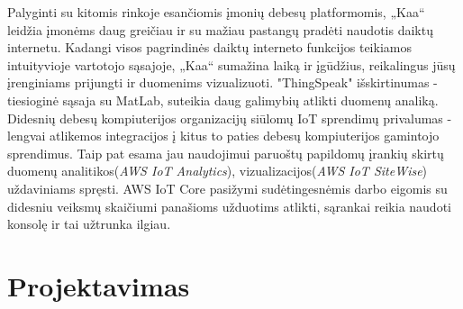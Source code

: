 \documentclass{VUMIFInfBakalaurinis}
\begin{document}
Palyginti su kitomis rinkoje esančiomis įmonių debesų platformomis, „Kaa“ leidžia įmonėms daug greičiau ir su mažiau pastangų pradėti naudotis daiktų internetu.
Kadangi visos pagrindinės daiktų interneto funkcijos teikiamos intuityvioje vartotojo sąsajoje, „Kaa“ sumažina laiką ir įgūdžius, reikalingus jūsų įrenginiams prijungti ir duomenims vizualizuoti.
"ThingSpeak" išskirtinumas - tiesioginė sąsaja su MatLab, suteikia daug galimybių atlikti duomenų analiką.
Didesnių debesų kompiuterijos organizacijų siūlomų IoT sprendimų privalumas - lengvai atlikemos integracijos į kitus to paties debesų kompiuterijos gamintojo sprendimus.
Taip pat esama jau naudojimui paruoštų papildomų įrankių skirtų duomenų analitikos(\emph{AWS IoT Analytics}), vizualizacijos(\emph{AWS IoT SiteWise}) uždaviniams spręsti.
AWS IoT Core pasižymi sudėtingesnėmis darbo eigomis su didesniu veiksmų skaičiumi panašioms užduotims atlikti, sąrankai reikia naudoti konsolę ir tai užtrunka ilgiau.

\section{Projektavimas}
\end{document}
